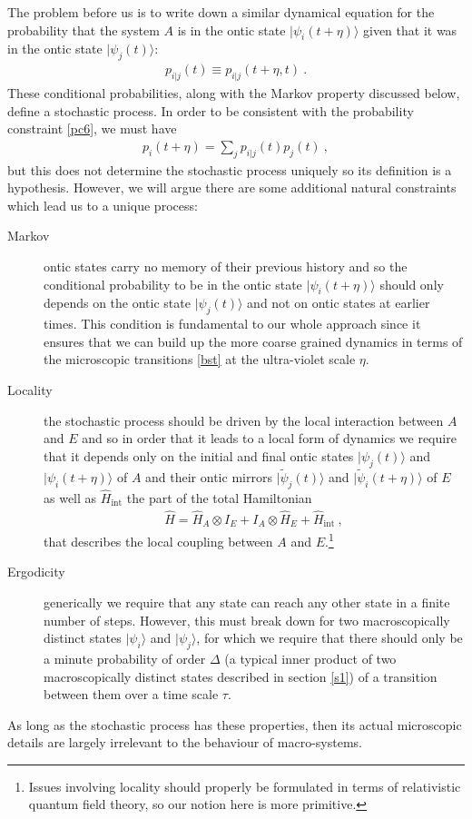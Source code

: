 \documentclass[%
preprint,
nofootinbib,
 amsmath,amssymb,
aps,
]{revtex4-1}
\def\ket#1{| #1\rangle}
\newcommand{\EQ}[1]{\begin{equation}\begin{split} #1
\end{split}\end{equation}}
\begin{document}
The problem before us is to write down a similar dynamical equation for the probability that the
system $A$ is in the ontic state $\ket{\psi_i(t+\eta)}$ given that it was in the ontic state $\ket{\psi_j(t)}$:
\EQ{
p_{i|j}(t)\equiv p_{i|j}(t+\eta,t)\ .
\label{bst}
}
These conditional probabilities, along with the Markov property discussed below, define a stochastic process. In order to be consistent with the probability constraint \eqref{pc6}, we must have
\EQ{
p_i(t+\eta)=\sum_jp_{i|j}(t)p_j(t)\ ,
\label{pc7}
}
but this does not determine the stochastic process uniquely so its definition is a hypothesis. However, we will argue there are some additional natural constraints which lead us to a unique process:
\begin{description}
\item[Markov] ontic states carry no memory of their previous history and so the conditional probability to be in the ontic state $\ket{\psi_i(t+\eta)}$ should only depends on the ontic state $\ket{\psi_j(t)}$ and not on ontic states at earlier times. This condition is fundamental to our whole approach since it ensures that we can build up the more coarse grained dynamics in terms of the microscopic transitions \eqref{bst} at the ultra-violet scale $\eta$.
\item[Locality] the stochastic process should be driven by the local 
interaction between $A$ and $E$ and so 
in order that it leads to a local form of dynamics we require that it depends only on the 
initial and final ontic states $\ket{\psi_j(t)}$ and $\ket{\psi_i(t+\eta)}$ of $A$ and their ontic mirrors $\ket{\tilde\psi_j(t)}$ and $\ket{\tilde\psi_i(t+\eta)}$ of $E$ as well as $\hat H_\text{int}$ the part of the total Hamiltonian 
\EQ{
\hat H=\hat H_A\otimes I_E+I_A\otimes\hat H_E+\hat H_\text{int}\ ,
\label{b32}
}
that describes the local coupling between $A$ and $E$.\footnote{Issues involving locality should properly be formulated in terms of relativistic quantum field theory, so our notion here is more primitive.} \item[Ergodicity] generically we require that any state can reach any other state in a finite number of steps. However, this must break down for two macroscopically distinct states $\ket{\psi_i}$ and $\ket{\psi_j}$, for which we require that there should only be a minute probability of order $\Delta$ (a typical inner product of two macroscopically distinct states described in section \ref{s1}) of a transition between them over a time scale $\tau$.
\end{description}
As long as the stochastic process has these properties, then its actual microscopic details are largely irrelevant to the behaviour of macro-systems.
\end{document}
